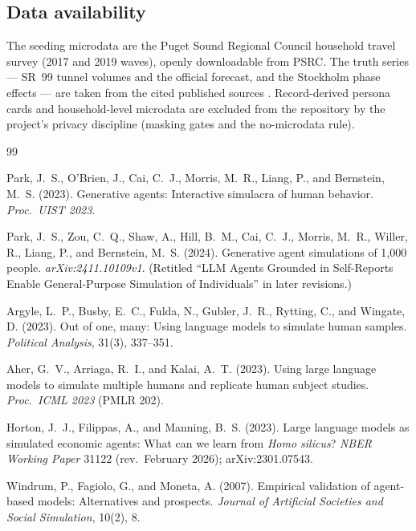 \documentclass[11pt]{article}
\begin{document}
\subsection*{Data availability}

The seeding microdata are the Puget Sound Regional Council household
travel survey (2017 and 2019 waves), openly downloadable from PSRC.
The truth series --- SR~99 tunnel volumes and the official forecast,
and the Stockholm phase effects --- are taken from the cited published
sources \citep{wsdot,eliasson2009,borjesson2012,eliasson2014}.
Record-derived persona cards and household-level microdata are
excluded from the repository by the project's privacy discipline
(masking gates and the no-microdata rule).

\begin{thebibliography}{99}
\small

Park, J.~S., O'Brien, J., Cai, C.~J., Morris, M.~R., Liang, P., and
Bernstein, M.~S. (2023).
Generative agents: Interactive simulacra of human behavior.
\emph{Proc.\ UIST 2023}.

Park, J.~S., Zou, C.~Q., Shaw, A., Hill, B.~M., Cai, C.~J., Morris,
M.~R., Willer, R., Liang, P., and Bernstein, M.~S. (2024).
Generative agent simulations of 1{,}000 people.
\emph{arXiv:2411.10109v1}. (Retitled ``LLM Agents Grounded in
Self-Reports Enable General-Purpose Simulation of Individuals'' in
later revisions.)

Argyle, L.~P., Busby, E.~C., Fulda, N., Gubler, J.~R., Rytting, C.,
and Wingate, D. (2023).
Out of one, many: Using language models to simulate human samples.
\emph{Political Analysis}, 31(3), 337--351.

Aher, G.~V., Arriaga, R.~I., and Kalai, A.~T. (2023).
Using large language models to simulate multiple humans and replicate
human subject studies.
\emph{Proc.\ ICML 2023} (PMLR 202).

Horton, J.~J., Filippas, A., and Manning, B.~S. (2023).
Large language models as simulated economic agents: What can we learn
from \emph{Homo silicus}?
\emph{NBER Working Paper} 31122 (rev.\ February 2026);
arXiv:2301.07543.

Windrum, P., Fagiolo, G., and Moneta, A. (2007).
Empirical validation of agent-based models: Alternatives and
prospects.
\emph{Journal of Artificial Societies and Social Simulation}, 10(2),
8.


\end{thebibliography}
\end{document}
